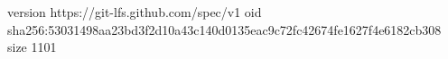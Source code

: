 version https://git-lfs.github.com/spec/v1
oid sha256:53031498aa23bd3f2d10a43c140d0135eac9c72fc42674fe1627f4e6182cb308
size 1101
